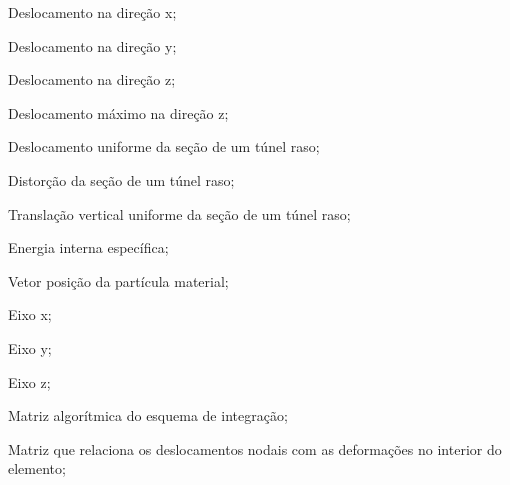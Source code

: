 \item[$ u_x $] 			Deslocamento na direção x;
\item[$ u_y $] 			Deslocamento na direção y;
\item[$ u_z $] 			Deslocamento na direção z;
\item[$ u_{z_{max}} $] 	Deslocamento máximo na direção z;
\item[$ u_\varepsilon $] Deslocamento uniforme da seção de um túnel raso;
\item[$ u_\delta $] 	 Distorção da seção de um túnel raso;
\item[$ \Delta u_y $] 	 Translação vertical uniforme da seção de um túnel raso;
\item[$ w $] 	 		Energia interna específica;
\item[$\xl$]			Vetor posição da partícula material;
\item[$x$]				Eixo x;
\item[$y$]				Eixo y;
\item[$z$]				Eixo z;

\item[\textbf{Latino maiúsculo:}]
\item[$\All$]	Matriz algorítmica do esquema de integração;
\item[$\Bll$]	Matriz que relaciona os deslocamentos nodais com as deformações no interior do elemento;

